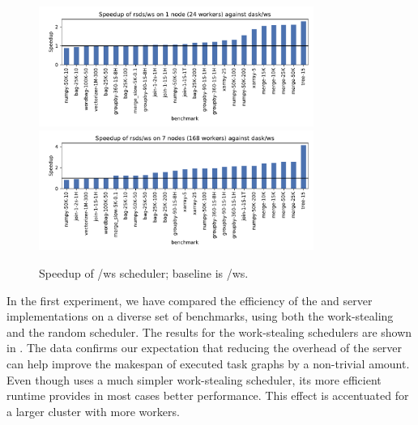 \begin{figure}
	\centering
	\includegraphics[width=0.8\textwidth]{./imgs/rsds/charts/speedup-rsds-ws-1}
	\includegraphics[width=0.8\textwidth]{./imgs/rsds/charts/speedup-rsds-ws-7}
	\caption{Speedup of \rsds{}/ws scheduler; baseline is \dask{}/ws.}
	\label{fig:rsds-dask-ws-all}
\end{figure}

In the first experiment, we have compared the efficiency of the \rsds{} and
\dask{} server implementations on a diverse set of benchmarks, using both the
work-stealing and the random scheduler. The results for the work-stealing schedulers are shown in
. The data confirms our expectation that reducing the overhead of the
server can help improve the makespan of executed task graphs by a non-trivial amount. Even though
\rsds{} uses a much simpler work-stealing scheduler, its more efficient runtime
provides in most cases better performance. This effect is accentuated for a larger cluster with
more workers.

